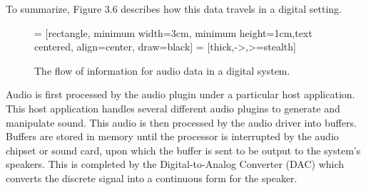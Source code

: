 To summarize, Figure 3.6 describes how this data travels in a digital setting.

\begin{figure}[h] %
	 = [rectangle, minimum width=3cm, minimum height=1cm,text centered, align=center, draw=black]
	 = [thick,->,>=stealth]
	\begin{center}
		\caption{The flow of information for audio data in a digital system.}
	\end{center}
\end{figure}

Audio is first processed by the audio plugin under a particular host application. This host application handles several different audio plugins to generate and manipulate sound. This audio is then processed by the audio driver into buffers. Buffers are stored in memory until the processor is interrupted by the audio chipset or sound card, upon which the buffer is sent to be output to the system's speakers. This is completed by the Digital-to-Analog Converter (DAC) which converts the discrete signal into a continuous form for the speaker.

